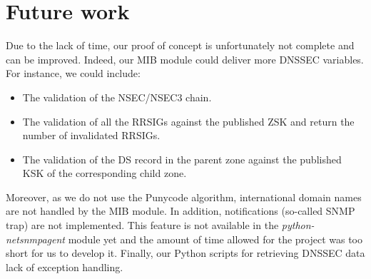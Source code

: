 \section{Future work}
\label{chap:future-work}
Due to the lack of time, our proof of concept is unfortunately not complete and can be improved. Indeed, our MIB module could deliver more DNSSEC variables. For instance, we could include:
\begin{itemize}
\item The validation of the NSEC/NSEC3 chain.
\item The validation of all the RRSIGs against the published ZSK and return the number of invalidated RRSIGs.
\item The validation of the DS record in the parent zone against the published KSK of the corresponding child zone.
\end{itemize} 
Moreover, as we do not use the Punycode algorithm, international domain names are not handled by the MIB module. In addition, notifications (so-called SNMP trap) are not implemented. This feature is not available in the \textit{python-netsnmpagent} module yet and the amount of time allowed for the project was too short for us to develop it. Finally, our Python scripts for retrieving DNSSEC data lack of exception handling. 
